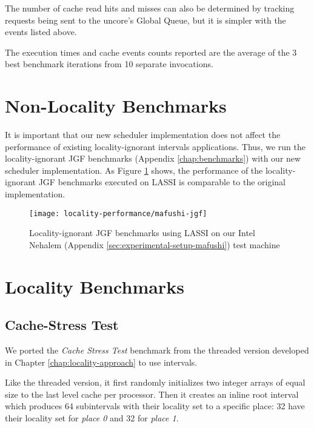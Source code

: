 The number of cache read hits and misses can also be determined by
tracking requests being sent to the uncore's Global Queue, but it is
simpler with the events listed above.

The execution times and cache events counts reported are the average
of the 3 best benchmark iterations from 10 separate invocations.


\section{Non-Locality Benchmarks}
\label{sec:locality-performance-non-locality}

It is important that our new scheduler implementation does not affect
the performance of existing locality-ignorant intervals
applications. Thus, we run the locality-ignorant JGF benchmarks
(Appendix \ref{chap:benchmarks}) with our new scheduler
implementation. As Figure \ref{fig:locality-performance-jgf} shows,
the performance of the locality-ignorant JGF benchmarks executed on
LASSI is comparable to the original implementation.

\begin{figure}[!ht]
  \centering
  \texttt{[image: locality-performance/mafushi-jgf]}
  \caption[Locality-ignorant JGF benchmarks]{Locality-ignorant JGF
    benchmarks using LASSI on our Intel Nehalem (Appendix
    \ref{sec:experimental-setup-mafushi}) test machine}
  \label{fig:locality-performance-jgf}
\end{figure}


\section{Locality Benchmarks}
\label{sec:locality-performance-locality}

\subsection{Cache-Stress Test}
\label{sec:locality-performance-cache-stress-test}

We ported the \emph{Cache Stress Test} benchmark from the threaded
version developed in Chapter \ref{chap:locality-approach} to use
intervals.

Like the threaded version, it first randomly initializes two integer
arrays of equal size to the last level cache per processor. Then it
creates an inline root interval which produces 64 subintervals with
their locality set to a specific place: 32 have their locality set for
\emph{place 0} and 32 for \emph{place 1}.


